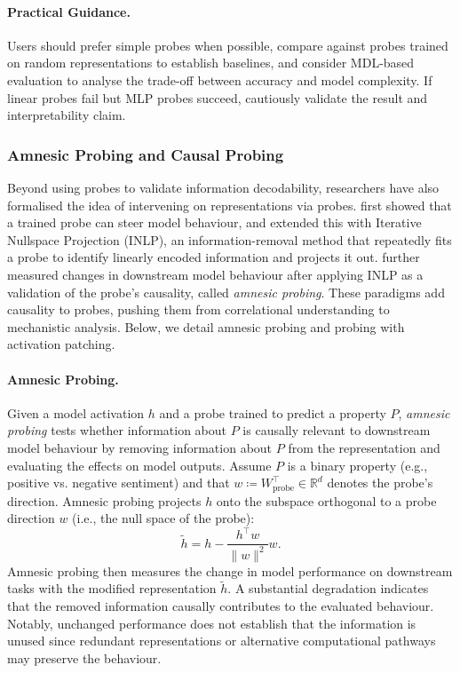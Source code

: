 \paragraph{Practical Guidance.}
Users should prefer simple probes when possible, compare against probes trained on random representations to establish baselines, and consider MDL-based evaluation to analyse the trade-off between accuracy and model complexity. If linear probes fail but MLP probes succeed, cautiously validate the result and interpretability claim.

\subsubsection{Amnesic Probing and Causal Probing}
\label{subsubsec: amnesic probing}
Beyond using probes to validate information decodability, researchers have also formalised the idea of intervening on representations via probes.  first showed that a trained probe can steer model behaviour, and  extended this with Iterative Nullspace Projection (INLP), an information-removal method that repeatedly fits a probe to identify linearly encoded information and projects it out.  further measured changes in downstream model behaviour after applying INLP as a validation of the probe's causality, called \emph{amnesic probing}. These paradigms add causality to probes, pushing them from correlational understanding to mechanistic analysis. Below, we detail amnesic probing and probing with activation patching.

\paragraph{Amnesic Probing.}
\begin{definitionbox}
Given a model activation $h$ and a probe trained to predict a property $P$, \emph{amnesic probing} tests whether information about $P$ is causally relevant
to downstream model behaviour by removing information about $P$ from the
representation and evaluating the effects on model outputs. Assume $P$ is a binary property (e.g., positive vs. negative sentiment) and that $w \coloneqq W_{\text{probe}}^\top \in \mathbb{R}^{d}$ denotes the probe's direction. Amnesic probing projects $h$ onto the subspace orthogonal to a probe
direction $w$ (i.e., the null space of the probe):
\[
\tilde{h}
=
h
-
\frac{h^\top w}{\|w\|^2}w.
\]
Amnesic probing then measures the change in model performance on downstream tasks with the modified representation $\tilde{h}$. A substantial degradation indicates that the removed information causally contributes to the evaluated behaviour. Notably, unchanged performance does not establish that the information is unused since redundant representations or alternative computational pathways may preserve the behaviour.
\end{definitionbox}

